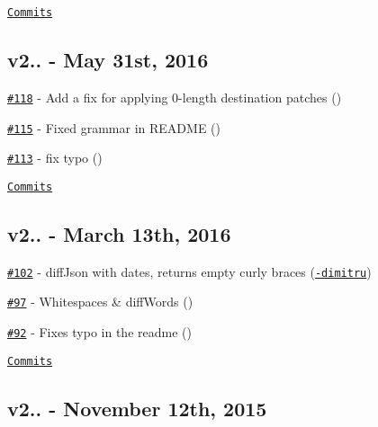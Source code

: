 \href{https://github.com/kpdecker/jsdiff/compare/v2.2.3...v3.0.0}{\tt Commits}

\subsection*{v2.. -\/ May 31st, 2016}


\begin{DoxyItemize}
\item \href{https://github.com/kpdecker/jsdiff/pull/118}{\tt \#118} -\/ Add a fix for applying 0-\/length destination patches (\href{https://api.github.com/users/chaaz}{\tt })
\item \href{https://github.com/kpdecker/jsdiff/pull/115}{\tt \#115} -\/ Fixed grammar in R\+E\+A\+D\+ME (\href{https://api.github.com/users/krizalys}{\tt })
\item \href{https://github.com/kpdecker/jsdiff/pull/113}{\tt \#113} -\/ fix typo (\href{https://api.github.com/users/vmazare}{\tt })
\end{DoxyItemize}

\href{https://github.com/kpdecker/jsdiff/compare/v2.2.2...v2.2.3}{\tt Commits}

\subsection*{v2.. -\/ March 13th, 2016}


\begin{DoxyItemize}
\item \href{https://github.com/kpdecker/jsdiff/issues/102}{\tt \#102} -\/ diff\+Json with dates, returns empty curly braces (\href{https://api.github.com/users/dr-dimitru}{\tt -\/dimitru})
\item \href{https://github.com/kpdecker/jsdiff/issues/97}{\tt \#97} -\/ Whitespaces \& diff\+Words (\href{https://api.github.com/users/faiwer}{\tt })
\item \href{https://github.com/kpdecker/jsdiff/pull/92}{\tt \#92} -\/ Fixes typo in the readme (\href{https://api.github.com/users/bg451}{\tt })
\end{DoxyItemize}

\href{https://github.com/kpdecker/jsdiff/compare/v2.2.1...v2.2.2}{\tt Commits}

\subsection*{v2.. -\/ November 12th, 2015}


